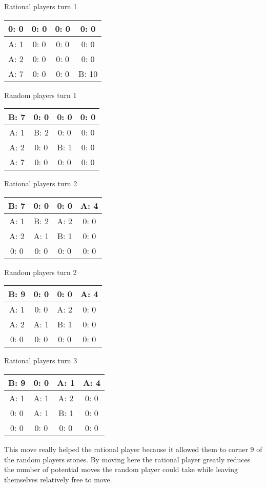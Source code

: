 \documentclass[12pt]{article}
\begin{document}
Rational players turn 1
\begin{center}
\begin{tabular}{|c|c|c|c|} 
\hline
0: 0  & 0: 0  & 0: 0  & 0: 0  \\ \hline
A: 1  & 0: 0  & 0: 0  & 0: 0  \\ \hline
A: 2  & 0: 0  & 0: 0  & 0: 0  \\ \hline
A: 7  & 0: 0  & 0: 0  & B: 10  \\ \hline
\end{tabular} 
\end{center}
Random players turn 1
\begin{center}
\begin{tabular}{|c|c|c|c|} 
\hline
B: 7  & 0: 0  & 0: 0  & 0: 0  \\ \hline
A: 1  & B: 2  & 0: 0  & 0: 0  \\ \hline
A: 2  & 0: 0  & B: 1  & 0: 0  \\ \hline
A: 7  & 0: 0  & 0: 0  & 0: 0  \\ \hline
\end{tabular} 
\end{center}

Rational players turn 2
\begin{center}
\begin{tabular}{|c|c|c|c|} 
\hline
B: 7  & 0: 0  & 0: 0  & A: 4  \\ \hline
A: 1  & B: 2  & A: 2  & 0: 0  \\ \hline
A: 2  & A: 1  & B: 1  & 0: 0  \\ \hline
0: 0  & 0: 0  & 0: 0  & 0: 0  \\ \hline
\end{tabular} 
\end{center}
Random players turn 2
\begin{center}
\begin{tabular}{|c|c|c|c|} 
\hline
B: 9  & 0: 0  & 0: 0  & A: 4  \\ \hline
A: 1  & 0: 0  & A: 2  & 0: 0  \\ \hline
A: 2  & A: 1  & B: 1  & 0: 0  \\ \hline
0: 0  & 0: 0  & 0: 0  & 0: 0  \\ \hline
\end{tabular} 
\end{center}

Rational players turn 3
\begin{center}
\begin{tabular}{|c|c|c|c|} 
\hline
B: 9  & 0: 0  & A: 1  & A: 4  \\ \hline
A: 1  & A: 1  & A: 2  & 0: 0  \\ \hline
0: 0  & A: 1  & B: 1  & 0: 0  \\ \hline
0: 0  & 0: 0  & 0: 0  & 0: 0  \\ \hline
\end{tabular} 
\end{center}
This move really helped the rational player because it allowed them to corner 9 of the random players stones. By moving here the rational player greatly reduces the number of potential moves the random player could take while leaving themselves relatively free to move.
\end{document}
